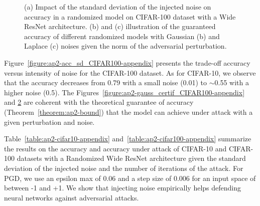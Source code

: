 \begin{figure}[htb]
\begin{subfigure}[t]{0.31\textwidth}
    \caption{}
    \label{figure:ap2-laplace_certif_CIFAR100-appendix}
  \end{subfigure}
  \caption{(a) Impact of the standard deviation of the injected noise on accuracy in a randomized model on CIFAR-100 dataset with a Wide ResNet architecture. (b) and (c) illustration of the guaranteed accuracy of different randomized models with Gaussian (b) and Laplace (c) noises given the norm of the adversarial perturbation.}
\end{figure}

Figure~\ref{figure:ap2-acc_sd_CIFAR100-appendix} presents the trade-off accuracy versus intensity of noise for the CIFAR-100 dataset. As for CIFAR-10, we observe that the accuracy decreases from 0.79 with a small noise (0.01) to $\sim$0.55 with a higher noise (0.5). The Figures~\ref{figure:ap2-gauss_certif_CIFAR100-appendix} and \ref{figure:ap2-laplace_certif_CIFAR100-appendix} are coherent with the theoretical guarantee of accuracy (Theorem~\ref{theorem:ap2-bound}) that the model can achieve under attack with a given perturbation and noise.


Table~\ref{table:ap2-cifar10-appendix} and~\ref{table:ap2-cifar100-appendix} summarize the results on the accuracy and accuracy under attack of CIFAR-10 and CIFAR-100 datasets with a Randomized Wide ResNet architecture given the standard deviation of the injected noise and the number of iterations of the attack. For PGD, we use an epsilon max of 0.06 and a step size of 0.006 for an input space of between -1 and +1. We show that injecting noise empirically helps defending neural networks against adversarial attacks.


